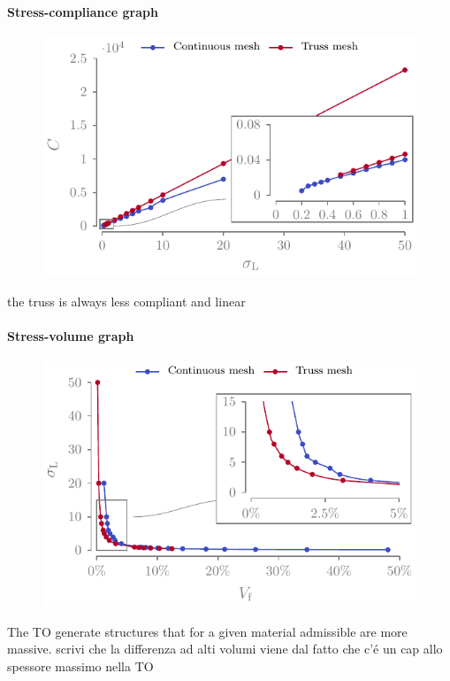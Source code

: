 \paragraph{Stress-compliance graph}
\begin{figure}[]
    \centering
    \includegraphics{figures/03_comparison_TO_TTO/00_stress_comp/stress_comp.pdf}
    \caption{}
    \label{fig:03_stress_comp}
\end{figure}
the truss is always less compliant and linear

\paragraph{Stress-volume graph}
\begin{figure}[]
    \centering
    \includegraphics{figures/03_comparison_TO_TTO/00_stress_vol/stress_vol.pdf}
    \caption{}
    \label{fig:03_stress_vol}
\end{figure}
The TO generate structures that for a given material admissible are more massive. scrivi che la differenza ad alti volumi viene dal fatto che c'é un cap allo spessore massimo nella TO

